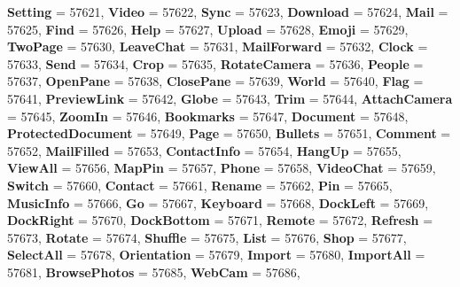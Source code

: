 \begin{DoxyCompactItemize}
{\bfseries Setting} = 57621, 
{\bfseries Video} = 57622, 
{\bfseries Sync} = 57623, 
{\bfseries Download} = 57624, 
\newline
{\bfseries Mail} = 57625, 
{\bfseries Find} = 57626, 
{\bfseries Help} = 57627, 
{\bfseries Upload} = 57628, 
\newline
{\bfseries Emoji} = 57629, 
{\bfseries Two\+Page} = 57630, 
{\bfseries Leave\+Chat} = 57631, 
{\bfseries Mail\+Forward} = 57632, 
\newline
{\bfseries Clock} = 57633, 
{\bfseries Send} = 57634, 
{\bfseries Crop} = 57635, 
{\bfseries Rotate\+Camera} = 57636, 
\newline
{\bfseries People} = 57637, 
{\bfseries Open\+Pane} = 57638, 
{\bfseries Close\+Pane} = 57639, 
{\bfseries World} = 57640, 
\newline
{\bfseries Flag} = 57641, 
{\bfseries Preview\+Link} = 57642, 
{\bfseries Globe} = 57643, 
{\bfseries Trim} = 57644, 
\newline
{\bfseries Attach\+Camera} = 57645, 
{\bfseries Zoom\+In} = 57646, 
{\bfseries Bookmarks} = 57647, 
{\bfseries Document} = 57648, 
\newline
{\bfseries Protected\+Document} = 57649, 
{\bfseries Page} = 57650, 
{\bfseries Bullets} = 57651, 
{\bfseries Comment} = 57652, 
\newline
{\bfseries Mail\+Filled} = 57653, 
{\bfseries Contact\+Info} = 57654, 
{\bfseries Hang\+Up} = 57655, 
{\bfseries View\+All} = 57656, 
\newline
{\bfseries Map\+Pin} = 57657, 
{\bfseries Phone} = 57658, 
{\bfseries Video\+Chat} = 57659, 
{\bfseries Switch} = 57660, 
\newline
{\bfseries Contact} = 57661, 
{\bfseries Rename} = 57662, 
{\bfseries Pin} = 57665, 
{\bfseries Music\+Info} = 57666, 
\newline
{\bfseries Go} = 57667, 
{\bfseries Keyboard} = 57668, 
{\bfseries Dock\+Left} = 57669, 
{\bfseries Dock\+Right} = 57670, 
\newline
{\bfseries Dock\+Bottom} = 57671, 
{\bfseries Remote} = 57672, 
{\bfseries Refresh} = 57673, 
{\bfseries Rotate} = 57674, 
\newline
{\bfseries Shuffle} = 57675, 
{\bfseries List} = 57676, 
{\bfseries Shop} = 57677, 
{\bfseries Select\+All} = 57678, 
\newline
{\bfseries Orientation} = 57679, 
{\bfseries Import} = 57680, 
{\bfseries Import\+All} = 57681, 
{\bfseries Browse\+Photos} = 57685, 
\newline
{\bfseries Web\+Cam} = 57686, 

\end{DoxyCompactItemize}
